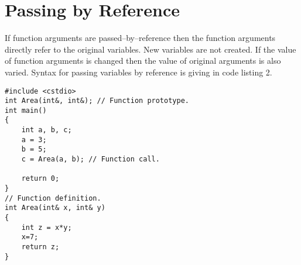 \documentclass{article}
\begin{document}
\section{Passing by Reference}
If function arguments are passed--by--reference then the function arguments directly refer to the original variables. New variables are not created. If the value of function arguments is changed then the value of original arguments is also varied. Syntax for passing variables by reference is giving in code listing 2.
\begin{lstlisting}[caption={Passing by reference}]
#include <cstdio>
int Area(int&, int&); // Function prototype.
int main()
{
	int a, b, c;
	a = 3;
	b = 5;
	c = Area(a, b); // Function call.
	
	return 0;
}
// Function definition.
int Area(int& x, int& y)
{
	int z = x*y;
	x=7;
	return z;
}
\end{lstlisting}
\end{document}

